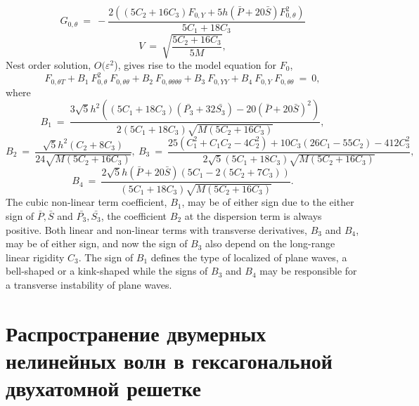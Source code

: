 \[
G_{0,\theta}~=~-\frac{2 \left((5 C_2+16 C_3) F_{0,Y}+5 h (\bar{P} +20 \bar{S}) F_{0,\theta}^2\right)}{5 C_1+18 C_3}
\]
\[
V~=~\sqrt{\frac{5 C_2 + 16 C_3}{5 M}},
\]
Nest order solution, $O(\varepsilon^2$), gives rise to the model equation for $F_0$,
\begin{equation}
	F_{0,\theta T}+ B_1~ F_{0,\theta}^2~ F_{0,\theta \theta} +B_2 ~F_{0,\theta \theta \theta \theta}+ B_3~ F_{0,Y Y}+B_4~F_{0,Y}~ F_{0,\theta \theta}~=~0, \label{kpsh}
\end{equation}
where
\[
B_1~=~\frac{3 \sqrt{5} h^2 \left((5 C_1 +18 C_3)(\bar{P_3}+32 \bar{S_3})-20 (\bar{P}+20 \bar{S})^2 \right)}{2 (5 C_1+18 C_3) \sqrt{M (5 C_2+16 C_3)}},
\]
\[
B_2~=~\frac{\sqrt{5} h^2 (C_2+8 C_3)}{24 \sqrt{M (5 C_2+16 C_3)}},~B_3~=~\frac{25 \left(C_1^2+C_1 C_2-4 C_2^2\right)+10 C_3 (26 C_1-55 C_2)-412 C_3^2}
{2 \sqrt{5} (5 C_1+18 C_3) \sqrt{M (5 C_2+16 C_3)}},
\]
\[
B_4~=~\frac{2 \sqrt{5} h (\bar{P}+20 \bar{S}) (5 C_1-2 (5 C_2+7 C_3))}{(5 C_1+18 C_3) \sqrt{M (5 C_2+16 C_3)}}.
\]
The cubic non-linear term coefficient, $B_1$, may be of either sign due to the either sign of $\bar{P}, \bar{S}$ and $\bar{P_3}, \bar{S_3}$, the coefficient $B_2$ at the dispersion term is always positive. Both linear and non-linear terms with transverse derivatives, $B_3$ and $B_4$, may be of either sign, and now the sign of $B_3$ also depend on the long-range linear rigidity $C_3$. The sign of $B_1$ defines the type of localized of plane waves, a bell-shaped or a  kink-shaped while the signs of  $B_3$ and $B_4$ may be responsible for a transverse instability of plane waves.


\section{Распространение двумерных нелинейных волн в гексагональной двухатомной решетке}


